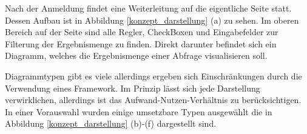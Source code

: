 Nach der Anmeldung findet eine Weiterleitung auf die eigentliche Seite statt. Dessen Aufbau ist in Abbildung \ref{konzept_darstellung} (a) zu sehen. Im oberen Bereich auf der Seite sind alle Regler, CheckBoxen und Eingabefelder zur Filterung der Ergebnismenge zu finden. Direkt darunter befindet sich ein Diagramm, welches die Ergebnismenge einer Abfrage visualisieren soll.


Diagrammtypen gibt es viele allerdings ergeben sich Einschränkungen durch die Verwendung eines Framework. Im Prinzip lässt sich jede Darstellung verwirklichen, allerdings ist das Aufwand-Nutzen-Verhältnis zu berücksichtigen. In einer Vorauswahl wurden einige umsetzbare Typen ausgewählt die in Abbildung \ref{konzept_darstellung} (b)-(f) dargestellt sind. 

\begin{figure}[H]
\hfill
{}\hfill
{}\hfill

\end{figure}
